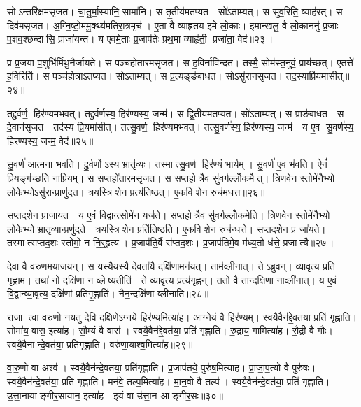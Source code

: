 सोऽन्तरि॑क्षमसृजत। चा॒तु॒र्मा॒स्यानि॒ सामा॑नि। स तृ॒तीय॑मतप्यत। सो॑ऽताम्यत्। स सुव॒रिति॒ व्याह॑रत्। स दिव॑मसृजत। अ॒ग्नि॒ष्टो॒ममु॒क्थ्य॑मतिरा॒त्रमृच॑। ए॒ता वै व्याहृ॑तय इ॒मे लो॒काः। इ॒मान्खलु॒ वै लो॒काननु॑ प्र॒जाः प॒शव॒श्छन्दासि॒ प्राजा॑यन्त। य ए॒वमे॒ताः प्र॒जाप॑तेः प्रथ॒मा व्याहृ॑ती॒ प्रजा॑ता॒ वेद॑॥२३॥

प्र प्र॒जया॑ प॒शुभि॑र्मिथु॒नैर्जा॑यते। स पञ्च॑होतारमसृजत। स ह॒विर्नावि॑न्दत। तस्मै॒ सोम॑स्त॒नुवं॒ प्राय॑च्छत्। ए॒तत्ते॑ ह॒विरिति॑। स पञ्च॑होत्राऽतप्यत। सो॑ऽताम्यत्। स प्र॒त्यङ्ङ॑बाधत। सोऽसु॑रानसृजत। तद॒स्याप्रि॑यमासीत्॥२४॥

तद्दु॒र्वर्ण॒ हिर॑ण्यमभवत्। तद्दु॒र्वर्ण॑स्य॒ हिर॑ण्यस्य॒ जन्म॑। स द्वि॒तीय॑मतप्यत। सो॑ऽताम्यत्। स प्राङ॑बाधत। स दे॒वान॑सृजत। तद॑स्य प्रि॒यमा॑सीत्। तत्सु॒वर्ण॒ हिर॑ण्यमभवत्। तत्सु॒वर्ण॑स्य॒ हिर॑ण्यस्य॒ जन्म॑। य ए॒व सु॒वर्ण॑स्य॒ हिर॑ण्यस्य॒ जन्म॒ वेद॑॥२५॥

सु॒वर्ण॑ आ॒त्मना॑ भवति। दु॒र्वर्णोऽस्य॒ भ्रातृ॑व्यः। तस्मात्सु॒वर्ण॒ हिर॑ण्यं भा॒र्यम्। सु॒वर्ण॑ ए॒व भ॑वति। ऐनं॑ प्रि॒यङ्ग॑च्छति॒ नाप्रि॑यम्। स स॒प्तहो॑तारमसृजत। स स॒प्तहोत्रै॒व सु॑व॒र्गल्लोँ॒कमैत्। त्रि॒ण॒वेन॒ स्तोमे॑नै॒भ्यो लो॒केभ्योऽसु॑रा॒न्प्राणु॑दत। त्र॒य॒स्त्रि॒शेन॒ प्रत्य॑तिष्ठत्। ए॒क॒वि॒शेन॒ रुच॑मधत्त॥२६॥

स॒प्त॒द॒शेन॒ प्राजा॑यत। य ए॒वं वि॒द्वान्त्सोमे॑न॒ यज॑ते। स॒प्तहोत्रै॒व सु॑व॒र्गल्लोँ॒कमे॑ति। त्रि॒ण॒वेन॒ स्तोमे॑नै॒भ्यो लो॒केभ्यो॒ भ्रातृ॑व्या॒न्प्रणु॑दते। त्र॒य॒स्त्रि॒शेन॒ प्रति॑तिष्ठति। ए॒क॒वि॒शेन॒ रुच॑न्धत्ते। स॒प्त॒द॒शेन॒ प्र जा॑यते। तस्मात्सप्तद॒शः स्तोमो॒ न नि॒र्॒हृत्य॑। प्र॒जाप॑ति॒र्वै स॑प्तद॒शः। प्र॒जाप॑तिमे॒व म॑ध्य॒तो ध॑त्ते॒ प्रजात्यै॥२७॥\anuvakamend[अ॒न॒न्द॒द्भुव॒ इति॒ व्याह॑र॒द्वेदा॑सी॒द्वेदा॑धत्त॒ प्रजात्यै]

दे॒वा वै वरु॑णमयाजयन्। स यस्यै॑यस्यै दे॒वता॑यै॒ दक्षि॑णा॒मन॑यत्। ताम॑व्लीनात्। तेऽब्रुवन्। व्या॒वृत्य॒ प्रति॑ गृह्णाम। तथा॑ नो॒ दक्षि॑णा॒ न व्लेष्य॒तीति॑। ते व्या॒वृत्य॒ प्रत्य॑गृह्णन्। ततो॒ वै तान्दक्षि॑णा॒ नाव्ली॑नात्। य ए॒वं वि॒द्वान्व्या॒वृत्य॒ दक्षि॑णां प्रतिगृ॒ह्णाति॑। नैन॒न्दक्षि॑णा व्लीनाति॥२८॥

राजा त्वा॒ वरु॑णो नयतु देवि दक्षिणे॒ऽग्नये॒ हिर॑ण्य॒मित्या॑ह। आ॒ग्ने॒यं वै हिर॑ण्यम्। स्वयै॒वैन॑द्दे॒वत॑या॒ प्रति॑ गृह्णाति। सोमा॑य॒ वास॒ इत्या॑ह। सौ॒म्यं वै वास॑। स्वयै॒वैन॑द्दे॒वत॑या॒ प्रति॑ गृह्णाति। रु॒द्राय॒ गामित्या॑ह। रौ॒द्री वै गौः। स्वयै॒वैनान्दे॒वत॑या॒ प्रति॑गृह्णाति। वरु॑णा॒याश्व॒मित्या॑ह॥२९॥

वा॒रु॒णो वा अश्व॑। स्वयै॒वैन॑न्दे॒वत॑या॒ प्रति॑गृह्णाति। प्र॒जाप॑तये॒ पुरु॑ष॒मित्या॑ह। प्रा॒जा॒प॒त्यो वै पुरु॑षः। स्वयै॒वैन॑न्दे॒वत॑या॒ प्रति॑ गृह्णाति। मन॑वे॒ तल्प॒मित्या॑ह। मा॒न॒वो वै तल्प॑। स्वयै॒वैन॑न्दे॒वत॑या॒ प्रति॑ गृह्णाति। उ॒त्ता॒नायाङ्गीर॒सायान॒ इत्या॑ह। इ॒यं वा उ॑त्ता॒न आङ्गीर॒सः॥३०॥

